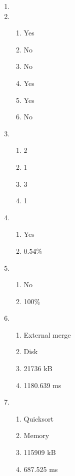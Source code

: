 \documentclass{homework}
\begin{document}
\begin{enumerate}
    \item {}
    
    \item \begin{enumerate}
        \item Yes
        \item No
        \item No
        \item Yes   %
        \item Yes
        \item No
    \end{enumerate}

    \item \begin{enumerate}
        \item 2
        \item 1
        \item 3
        \item 1     %
    \end{enumerate}

    \item \begin{enumerate}
        \item Yes
        \item 0.54\%
    \end{enumerate}

    \item \begin{enumerate}
        \item No
        \item 100\%
    \end{enumerate}

    \item \begin{enumerate}
        \item External merge
        \item Disk
        \item 21736 kB
        \item 1180.639 ms
    \end{enumerate}

    \item \begin{enumerate}
        \item Quicksort
        \item Memory
        \item 115909 kB
        \item 687.525 ms
    \end{enumerate}
\end{enumerate}
\end{document}
